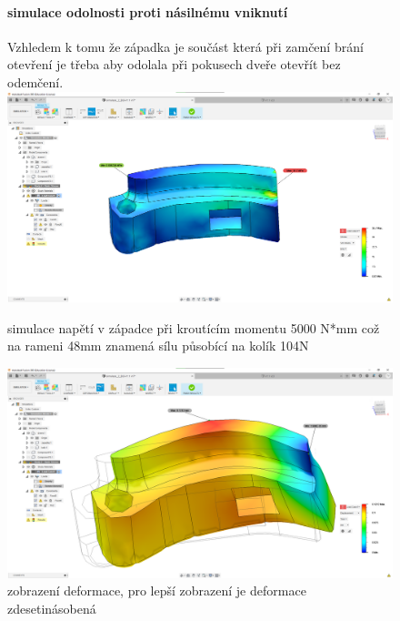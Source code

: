 \begin{figure}[htbp]
    \paragraph{simulace odolnosti proti násilnému vniknutí}
    Vzhledem k tomu že západka je součást která při zamčení brání otevření je třeba aby odolala při pokusech dveře otevřít bez odemčení.
    \centering
    \includegraphics[width=\textwidth]{kapitoly/obrazky/E4/zapadka/simulace/napeti_D1-M5000.png}
    \caption{simulace napětí v západce při kroutícím momentu 5000 N*mm což na rameni 48mm znamená sílu působící na kolík 104N}
    \includegraphics[width=\textwidth]{kapitoly/obrazky/E4/zapadka/simulace/Dislokace_D10-M5000.png}
    \caption{zobrazení deformace, pro lepší zobrazení je deformace zdesetinásobená}
    \label{fig:E4-simulace_zapadky}
\end{figure}


\newpage